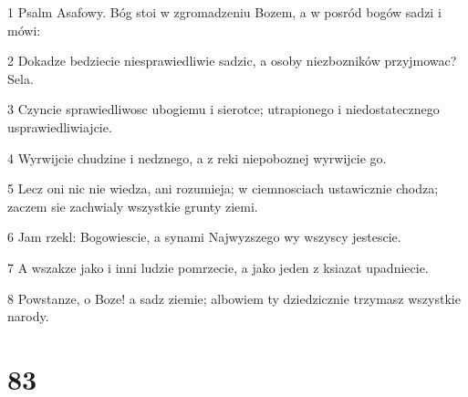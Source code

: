 \par 1 Psalm Asafowy. Bóg stoi w zgromadzeniu Bozem, a w posród bogów sadzi i mówi:
\par 2 Dokadze bedziecie niesprawiedliwie sadzic, a osoby niezbozników przyjmowac? Sela.
\par 3 Czyncie sprawiedliwosc ubogiemu i sierotce; utrapionego i niedostatecznego usprawiedliwiajcie.
\par 4 Wyrwijcie chudzine i nedznego, a z reki niepoboznej wyrwijcie go.
\par 5 Lecz oni nic nie wiedza, ani rozumieja; w ciemnosciach ustawicznie chodza; zaczem sie zachwialy wszystkie grunty ziemi.
\par 6 Jam rzekl: Bogowiescie, a synami Najwyzszego wy wszyscy jestescie.
\par 7 A wszakze jako i inni ludzie pomrzecie, a jako jeden z ksiazat upadniecie.
\par 8 Powstanze, o Boze! a sadz ziemie; albowiem ty dziedzicznie trzymasz wszystkie narody.

\chapter{83}

